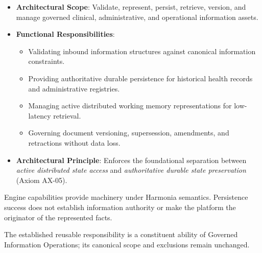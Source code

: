
\begin{itemize}

\item
\textbf{Architectural Scope}: Validate, represent, persist, retrieve, version, and manage governed clinical, administrative, and operational information assets.



\item
\textbf{Functional Responsibilities}:


\begin{itemize}

\item
Validating inbound information structures against canonical information constraints.



\item
Providing authoritative durable persistence for historical health records and administrative registries.



\item
Managing active distributed working memory representations for low-latency retrieval.



\item
Governing document versioning, supersession, amendments, and retractions without data loss.



\end{itemize}


\item
\textbf{Architectural Principle}: Enforces the foundational separation between \emph{active distributed state access} and \emph{authoritative durable state preservation} (Axiom AX-05).



\end{itemize}


Engine capabilities provide machinery under Harmonia semantics. Persistence success does not establish information authority or make the platform the originator of the represented facts.



The established reusable responsibility is a constituent ability of Governed Information Operations; its canonical scope and exclusions remain unchanged.


